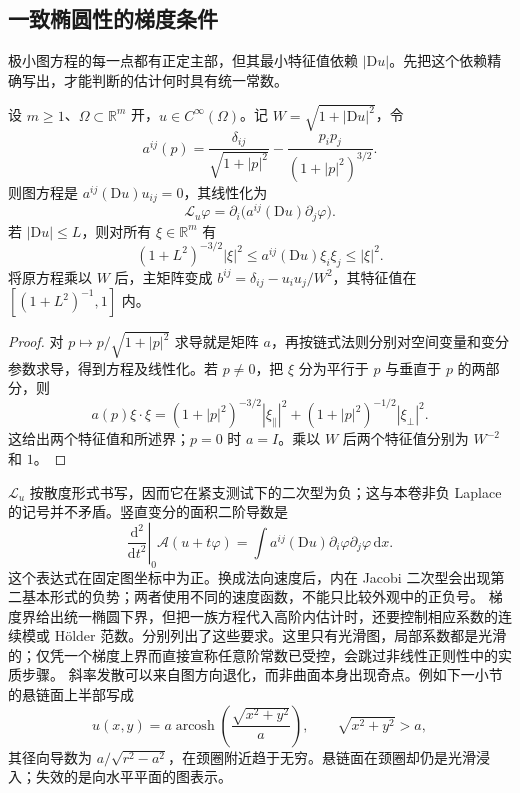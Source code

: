 \subsection{一致椭圆性的梯度条件}
\label{g3:subsec:1902:02}
极小图方程的每一点都有正定主部，但其最小特征值依赖 \(|\mathrm Du|\)。先把这个依赖精确写出，才能判断的估计何时具有统一常数。

\begin{proposition}\label{g3:prop:minimal-graph-ellipticity}
	设 \(m\ge1\)、\(\Omega\subset\mathbb R^m\) 开，\(u\in C^\infty(\Omega)\)。记 \(W=\sqrt{1+|\mathrm Du|^2}\)，令
	\[
		a^{ij}(p)=\frac{\delta_{ij}}{\sqrt{1+|p|^2}}
		-\frac{p_i p_j}{(1+|p|^2)^{3/2}}.
	\]
	则图方程是 \(a^{ij}(\mathrm Du)u_{ij}=0\)，其线性化为
	\begin{equation}\label{g3:eq:minimal-graph-linearization}
		\mathcal L_u\varphi
		=\partial_i\bigl(a^{ij}(\mathrm Du)\partial_j\varphi\bigr).
	\end{equation}
	若 \(|\mathrm Du|\le L\)，则对所有 \(\xi\in\mathbb R^m\) 有
	\begin{equation}\label{g3:eq:minimal-graph-elliptic-bounds}
		(1+L^2)^{-3/2}|\xi|^2
		\le a^{ij}(\mathrm Du)\xi_i\xi_j\le|\xi|^2.
	\end{equation}
	将原方程乘以 \(W\) 后，主矩阵变成
	\(b^{ij}=\delta_{ij}-u_i u_j/W^2\)，其特征值在
	\([(1+L^2)^{-1},1]\) 内。
\end{proposition}
\begin{proof}
	对 \(p\mapsto p/\sqrt{1+|p|^2}\) 求导就是矩阵 \(a\)，再按链式法则分别对空间变量和变分参数求导，得到方程及线性化。若 \(p\ne0\)，把 \(\xi\) 分为平行于 \(p\) 与垂直于 \(p\) 的两部分，则
	\[
		a(p)\xi\cdot\xi
		=(1+|p|^2)^{-3/2}|\xi_\parallel|^2
		+(1+|p|^2)^{-1/2}|\xi_\perp|^2.
	\]
	这给出两个特征值和所述界；\(p=0\) 时 \(a=I\)。乘以 \(W\) 后两个特征值分别为 \(W^{-2}\) 和 \(1\)。
\end{proof}

\(\mathcal L_u\) 按散度形式书写，因而它在紧支测试下的二次型为负；这与本卷非负 Laplace 的记号并不矛盾。竖直变分的面积二阶导数是
\[
	\left.\frac{\mathrm d^2}{\mathrm dt^2}\right|_0\mathcal A(u+t\varphi)
	=\int a^{ij}(\mathrm Du)\partial_i\varphi\partial_j\varphi\,\mathrm dx.
\]
这个表达式在固定图坐标中为正。换成法向速度后，内在 Jacobi 二次型会出现第二基本形式的负势；两者使用不同的速度函数，不能只比较外观中的正负号。
\ProseParagraphBreak
梯度界给出统一椭圆下界，但把一族方程代入高阶内估计时，还要控制相应系数的连续模或 Hölder 范数。分别列出了这些要求。这里只有光滑图，局部系数都是光滑的；仅凭一个梯度上界而直接宣称任意阶常数已受控，会跳过非线性正则性中的实质步骤。
\ProseParagraphBreak
斜率发散可以来自图方向退化，而非曲面本身出现奇点。例如下一小节的悬链面上半部写成
\[
	u(x,y)=a\operatorname{arcosh}\left(\frac{\sqrt{x^2+y^2}}a\right),
	\qquad \sqrt{x^2+y^2}>a,
\]
其径向导数为 \(a/\sqrt{r^2-a^2}\)，在颈圈附近趋于无穷。悬链面在颈圈却仍是光滑浸入；失效的是向水平平面的图表示。

